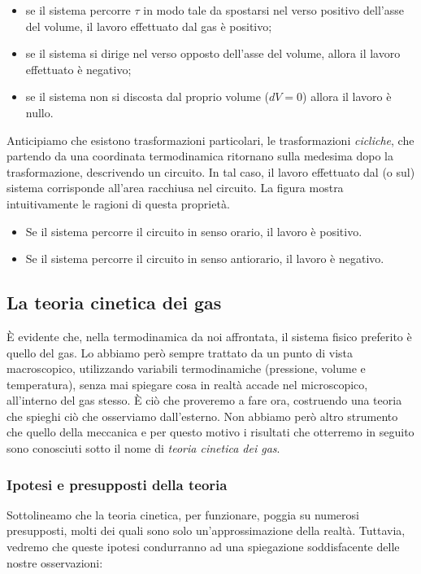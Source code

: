 \begin{itemize}
    \item se il sistema percorre $\tau$ in modo tale da spostarsi nel verso positivo
    dell'asse del volume, il lavoro effettuato dal gas è positivo;

    \item se il sistema si dirige nel verso opposto dell'asse del volume,
    allora il lavoro effettuato è negativo;

    \item se il sistema non si discosta dal proprio volume ($dV = 0$)
    allora il lavoro è nullo.
\end{itemize}

Anticipiamo che esistono trasformazioni particolari, le trasformazioni
\textit{cicliche}, che partendo da una coordinata termodinamica
ritornano sulla medesima dopo la trasformazione, descrivendo un circuito.
In tal caso, il lavoro effettuato dal (o sul) sistema corrisponde
all'area racchiusa nel circuito. La figura mostra intuitivamente le
ragioni di questa proprietà.

\begin{itemize}
    \item Se il sistema percorre il circuito in senso orario, il
    lavoro è positivo.

    \item Se il sistema percorre il circuito in senso antiorario,
    il lavoro è negativo.
\end{itemize}





\subsection{La teoria cinetica dei gas}
È evidente che, nella termodinamica da noi affrontata, il sistema
fisico preferito è quello del gas. Lo abbiamo però sempre trattato
da un punto di vista macroscopico, utilizzando variabili termodinamiche
(pressione, volume e temperatura), senza mai spiegare cosa in realtà
accade nel microscopico, all'interno del gas stesso. È ciò che proveremo
a fare ora, costruendo una teoria che spieghi ciò che osserviamo
dall'esterno. Non abbiamo però altro strumento che quello della meccanica
e per questo motivo i risultati che otterremo in seguito sono
conosciuti sotto il nome di \textit{teoria cinetica dei gas}.

\subsubsection*{Ipotesi e presupposti della teoria}
Sottolineamo che la teoria cinetica, per funzionare, poggia su numerosi
presupposti, molti dei quali sono solo un'approssimazione della realtà.
Tuttavia, vedremo che queste ipotesi condurranno ad una spiegazione
soddisfacente delle nostre osservazioni:

